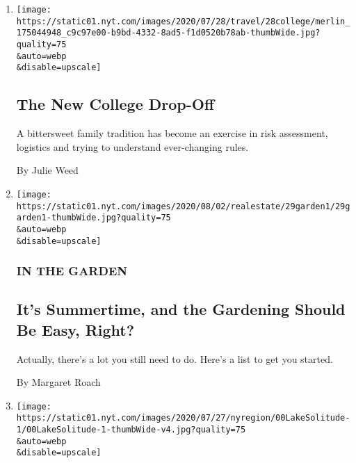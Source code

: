 \begin{enumerate}
\def\labelenumi{\arabic{enumi}.}
\item
  \href{/2020/07/29/travel/virus-college-travel-restrictions.html}{}

  \texttt{[image: https://static01.nyt.com/images/2020/07/28/travel/28college/merlin\_175044948\_c9c97e00-b9bd-4332-8ad5-f1d0520b78ab-thumbWide.jpg?quality=75\\\&auto=webp\\\&disable=upscale]}

  \hypertarget{the-new-college-drop-off}{%
  \subsection{The New College Drop-Off}\label{the-new-college-drop-off}}

  A bittersweet family tradition has become an exercise in risk
  assessment, logistics and trying to understand ever-changing rules.

  By Julie Weed
\item
  \href{/2020/07/29/realestate/garden-summer-august-chores.html}{}

  \texttt{[image: https://static01.nyt.com/images/2020/08/02/realestate/29garden1/29garden1-thumbWide.jpg?quality=75\\\&auto=webp\\\&disable=upscale]}

  \hypertarget{in-the-garden}{%
  \subsubsection{IN THE GARDEN}\label{in-the-garden}}

  \hypertarget{its-summertime-and-the-gardening-should-be-easy-right}{%
  \subsection{It's Summertime, and the Gardening Should Be Easy,
  Right?}\label{its-summertime-and-the-gardening-should-be-easy-right}}

  Actually, there's a lot you still need to do. Here's a list to get you
  started.

  By Margaret Roach
\item
  \href{/2020/07/29/nyregion/lake-solitude-closed-racism.html}{}

  \texttt{[image: https://static01.nyt.com/images/2020/07/27/nyregion/00LakeSolitude-1/00LakeSolitude-1-thumbWide-v4.jpg?quality=75\\\&auto=webp\\\&disable=upscale]}

  \hypertarget{hidden-gem-made-popular-by-tiktok-is-shut-to-keep-out-of-towners-away}{%
}
\end{enumerate}
